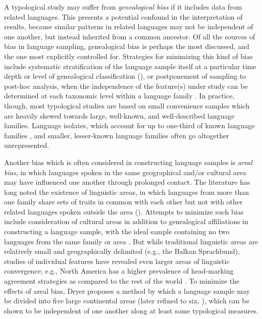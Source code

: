   A typological study may suffer from \textit{genealogical bias} if it includes data from related languages. This presents a potential confound in the interpretation of results, because similar patterns in related languages may not be independent of one another, but instead inherited from a common ancestor. Of all the sources of bias in language sampling, genealogical bias is perhaps the most discussed, and the one most explicitly controlled for. Strategies for minimizing this kind of bias include systematic stratification of the language sample itself at a particular time depth or level of genealogical classification (\citealt{Bell1978b,Maddieson1984,Dryer1989}), or postponement of sampling to post-hoc analysis, when the independence of the feature(s) under study can be determined at each taxonomic level within a language family \citep{Bickel2008}. In practice, though, most typological studies are based on small convenience samples which are heavily skewed towards large, well-known, and well-described language families. Language isolates, which account for up to one-third of known language families \citep{Campbell2016}, and smaller, lesser-known language families often go altogether unrepresented.

  Another bias which is often considered in constructing language samples is \textit{areal bias}, in which languages spoken in the same geographical and/or cultural area may have influenced one another through prolonged contact. The literature has long noted the existence of linguistic areas, in which languages from more than one family share sets of traits in common with each other but not with other related languages spoken outside the area (\citealt{AikhenvaldDixon2001a,Chirikba2008}). Attempts to minimize such bias include consideration of cultural areas in addition to genealogical affiliations in constructing a language sample, with the ideal sample containing no two languages from the same family or area \citep{Perkins1985}. But while traditional linguistic areas are relatively small and geographically delimited (e.g., the Balkan Sprachbund), studies of individual features have revealed even larger areas of linguistic convergence; e.g., North America has a higher prevalence of head-marking agreement strategies as compared to the rest of the world \citep{Dryer1989}. To minimize the effects of areal bias, Dryer proposes a method by which a language sample may be divided into five large continental areas (later refined to six, \citealt{Dryer1992}), which can be shown to be independent of one another along at least some typological measures.

